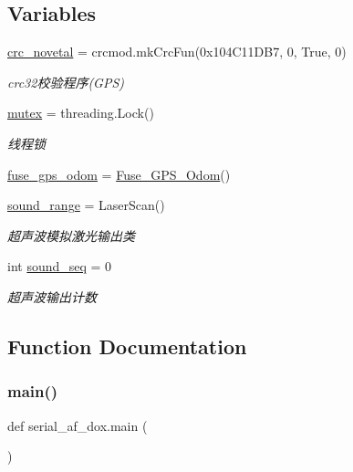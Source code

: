 \subsection*{Variables}
\begin{DoxyCompactItemize}
\item 
\hyperlink{namespaceserial__af__dox_ae0cff17238b33224c937e9cd91d8a9e4}{crc\+\_\+novetal} = crcmod.\+mk\+Crc\+Fun(0x104\+C11\+D\+B7, 0, True, 0)
\begin{DoxyCompactList}\small\item\em crc32校验程序(\+G\+P\+S) \end{DoxyCompactList}\item 
\hyperlink{namespaceserial__af__dox_ac926481060faca5f9441eccde6abcd70}{mutex} = threading.\+Lock()
\begin{DoxyCompactList}\small\item\em 线程锁 \end{DoxyCompactList}\item 
\hyperlink{namespaceserial__af__dox_af416f822d88d0dadcf98b45102f438f5}{fuse\+\_\+gps\+\_\+odom} = \hyperlink{classserial__af__dox_1_1_fuse___g_p_s___odom}{Fuse\+\_\+\+G\+P\+S\+\_\+\+Odom}()
\item 
\hyperlink{namespaceserial__af__dox_a13d14199f1884f8f701531739c925b4b}{sound\+\_\+range} = Laser\+Scan()
\begin{DoxyCompactList}\small\item\em 超声波模拟激光输出类 \end{DoxyCompactList}\item 
int \hyperlink{namespaceserial__af__dox_a22d3c8a8b00d42ed44028e9b070a9481}{sound\+\_\+seq} = 0
\begin{DoxyCompactList}\small\item\em 超声波输出计数 \end{DoxyCompactList}\end{DoxyCompactItemize}


\subsection{Function Documentation}
\mbox{\label{namespaceserial__af__dox_af39f958509555b34b2cb0bea98981418}} 
\subsubsection{\texorpdfstring{main()}{main()}}
{\footnotesize\ttfamily def serial\+\_\+af\+\_\+dox.\+main (\begin{DoxyParamCaption}{ }\end{DoxyParamCaption})}



